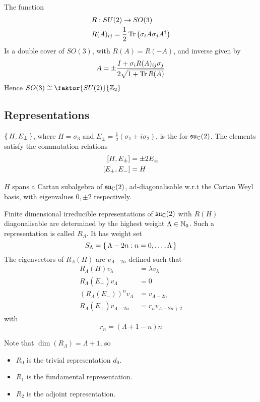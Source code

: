 \documentclass{article}
\begin{document}
\begin{fact}
The function 
\begin{align*}
     & R : SU(2) \to SO(3) \\
     & R(A)_{ij} = \frac{1}{2}\tr\left( \sigma_i A \sigma_j A^\dagger \right)
\end{align*}
Is a double cover of $SO(3)$, with $R(A)=R(-A)$, and inverse given by 
\[
A=\pm \frac{I+\sigma_i R(A)_{ij} \sigma_j}{2\sqrt{1+\tr R(A)}}
\]
Hence $SO(3)\cong\faktor{SU(2)}{\mbb{Z}_2}$
\end{fact}

\subsection{Representations}

\begin{definition}
$\set{  H, E_\pm  }$, where $H=\sigma_3$ and $E_\pm=\frac{1}{2}(\sigma_1\pm i\sigma_2 )$, is the  for $\mf{su}_\mbb{C}(2)$. The elements satisfy the commutation relations 
\begin{align*}
\comm[H]{E_\pm} &= \pm 2E_\pm \\
\comm[E_+]{E_-} &= H
\end{align*}
\end{definition} 

\begin{fact}
$H$ spans a Cartan subalgebra of $\mf{su}_\mbb{C}(2)$, ad-diagonalisable w.r.t the Cartan Weyl basis, with eigenvalues $0, \pm 2$ respectively. 
\end{fact}

\begin{theorem}
Finite dimensional irreducible representations of $\mf{su}_\mbb{C}(2)$ with $R(H)$ diagonalisable are determined by the highest weight $\Lambda\in\mbb{N}_0$. Such a representation is called $R_\Lambda$. It has weight set 
\[
S_\Lambda=\set{  \Lambda-2n : n=0,\dots,\Lambda  }
\]
The eigenvectors of $R_\Lambda(H)$ are $v_{\Lambda-2n}$ defined such that 
\begin{align*}
R_\Lambda(H) v_\lambda &= \lambda v_\lambda \\
R_\Lambda(E_+) v_\Lambda &= 0 \\
 \left(R_\Lambda(E_-)\right)^n v_{\Lambda} &= v_{\Lambda-2n} \\
 R_\Lambda(E_+) v_{\Lambda-2n} &= r_n v_{\Lambda-2n+2}
\end{align*}
with 
\[
r_n=(\Lambda+1-n)n
\]
\end{theorem}
Note that $\dim(R_\Lambda)=\Lambda+1$, so 
\begin{itemize}
    \item $R_0$ is the trivial representation $d_0$.
    \item $R_1$ is the fundamental representation.
    \item $R_2$ is the adjoint representation. 
\end{itemize}
\end{document}
